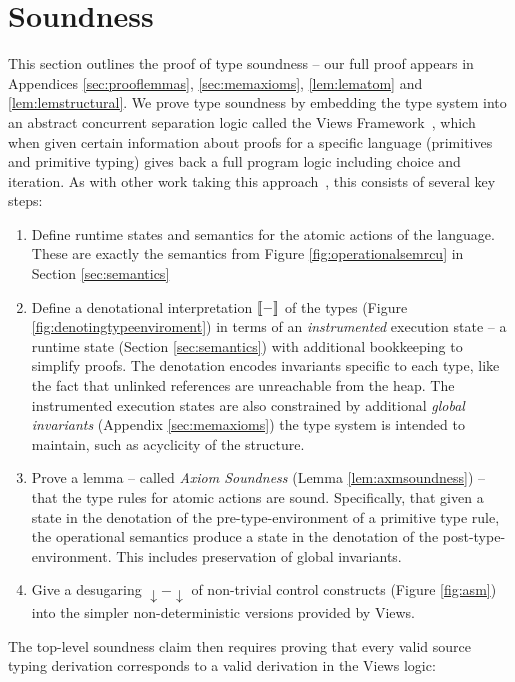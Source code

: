 \section{Soundness}
\label{sec:soundness}
This section outlines the proof of type soundness -- our full proof appears in Appendices \ref{sec:prooflemmas}, \ref{sec:memaxioms}, \ref{lem:lematom} and \ref{lem:lemstructural}.
We prove type soundness by embedding the type system into an abstract concurrent separation logic called the Views Framework~\cite{views}, which when given certain information about proofs for a specific language (primitives and primitive typing) gives back a full program logic including choice and iteration.  As with other work taking this approach~\cite{oopsla12,toplas17}, this consists of several key steps:
\begin{enumerate}
    \item Define runtime states and semantics for the atomic actions of the language.  These are exactly the semantics from Figure \ref{fig:operationalsemrcu} in Section \ref{sec:semantics}
    \item Define a denotational interpretation $\llbracket-\rrbracket$ of the types (Figure \ref{fig:denotingtypeenviroment}) in terms of an \emph{instrumented} execution state -- a runtime state (Section \ref{sec:semantics}) with additional bookkeeping to simplify proofs.  
    The denotation encodes invariants specific to each type, like the fact that \textsf{unlinked} references are unreachable from the heap. %
    The instrumented execution states are also constrained by additional \textit{global invariants} (Appendix \ref{sec:memaxioms}) the type system is intended to maintain, such as acyclicity of the structure.
    \item Prove a lemma -- called \emph{Axiom Soundness} (Lemma \ref{lem:axmsoundness}) -- that the type rules for atomic actions are sound.  Specifically, that given a state in the denotation of the pre-type-environment of a primitive type rule, the operational semantics produce a state in the denotation of the post-type-environment.  This includes preservation of global invariants.
    \item Give a desugaring $\downarrow-\downarrow$ of non-trivial control constructs (Figure \ref{fig:asm}) into the simpler non-deterministic versions provided by Views.
\end{enumerate}
The top-level soundness claim then requires proving that every valid source typing derivation corresponds to a valid derivation in the Views logic:
